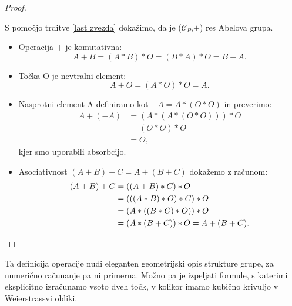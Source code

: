 \documentclass[12pt,a4paper,twoside]{article}
\theoremstyle{definition} %
\theoremstyle{plain} %
\numberwithin{equation}{section}  %
\begin{document}
\begin{proof}~

S pomočjo trditve \ref{last zvezda} dokažimo, da je ($\mathcal{C}_P$,$+$) res Abelova grupa.

\begin{itemize}
\item Operacija $+$ je komutativna:
$$A+B = (A \ast B ) \ast O = (B \ast A) \ast O = B+A.$$
\item Točka O je nevtralni element:
$$A+O=(A \ast O) \ast O = A.$$
\item Nasprotni element A definiramo kot $-A = A \ast (O \ast O )$ in preverimo:
\begin{align}
A + (-A) &{} = (A \ast (A \ast (O \ast O))) \ast O \nonumber \\
&{} = (O \ast O) \ast O \nonumber \\
&{} = O, \nonumber
\end{align}
kjer smo uporabili absorbcijo.
\item Asociativnost $(A + B) + C = A + (B + C)$ dokažemo z računom:
\begin{align}
(A + B) + C &{} = ((A + B) \ast C) \ast O \nonumber \\
&{} = (((A \ast B) \ast O) \ast C) \ast O \nonumber \\
&{} = (A \ast ((B \ast C) \ast O)) \ast O \nonumber \\
&{} = (A \ast (B + C)) \ast O = A + (B + C). \nonumber \qedhere
\end{align}
\end{itemize}
\end{proof}

Ta definicija operacije nudi eleganten geometrijski opis strukture grupe, za numerično računanje pa ni primerna. Možno pa je izpeljati formule, s katerimi eksplicitno
izračunamo vsoto dveh točk, v kolikor imamo kubično krivuljo v Weierstrassvi obliki.
\end{document}
